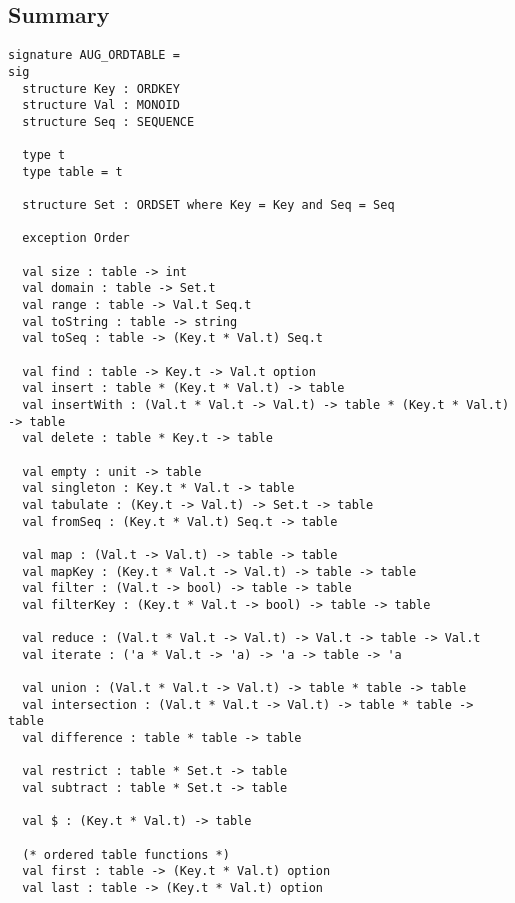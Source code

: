 \subsection{Summary}
\label{sec:aug-ordtable-interface::summary}

\begin{cluster}
\label{grp:grm:aug-ordtable-interface::signature}

\begin{gram}
\label{grm:aug-ordtable-interface::signature}
\begin{verbatim}
signature AUG_ORDTABLE =
sig
  structure Key : ORDKEY
  structure Val : MONOID
  structure Seq : SEQUENCE

  type t
  type table = t

  structure Set : ORDSET where Key = Key and Seq = Seq

  exception Order

  val size : table -> int
  val domain : table -> Set.t
  val range : table -> Val.t Seq.t
  val toString : table -> string
  val toSeq : table -> (Key.t * Val.t) Seq.t

  val find : table -> Key.t -> Val.t option
  val insert : table * (Key.t * Val.t) -> table
  val insertWith : (Val.t * Val.t -> Val.t) -> table * (Key.t * Val.t) -> table
  val delete : table * Key.t -> table

  val empty : unit -> table
  val singleton : Key.t * Val.t -> table
  val tabulate : (Key.t -> Val.t) -> Set.t -> table
  val fromSeq : (Key.t * Val.t) Seq.t -> table

  val map : (Val.t -> Val.t) -> table -> table
  val mapKey : (Key.t * Val.t -> Val.t) -> table -> table
  val filter : (Val.t -> bool) -> table -> table
  val filterKey : (Key.t * Val.t -> bool) -> table -> table

  val reduce : (Val.t * Val.t -> Val.t) -> Val.t -> table -> Val.t
  val iterate : ('a * Val.t -> 'a) -> 'a -> table -> 'a

  val union : (Val.t * Val.t -> Val.t) -> table * table -> table
  val intersection : (Val.t * Val.t -> Val.t) -> table * table -> table
  val difference : table * table -> table

  val restrict : table * Set.t -> table
  val subtract : table * Set.t -> table

  val $ : (Key.t * Val.t) -> table

  (* ordered table functions *)
  val first : table -> (Key.t * Val.t) option
  val last : table -> (Key.t * Val.t) option


\end{verbatim}
\end{gram}
\end{cluster}
